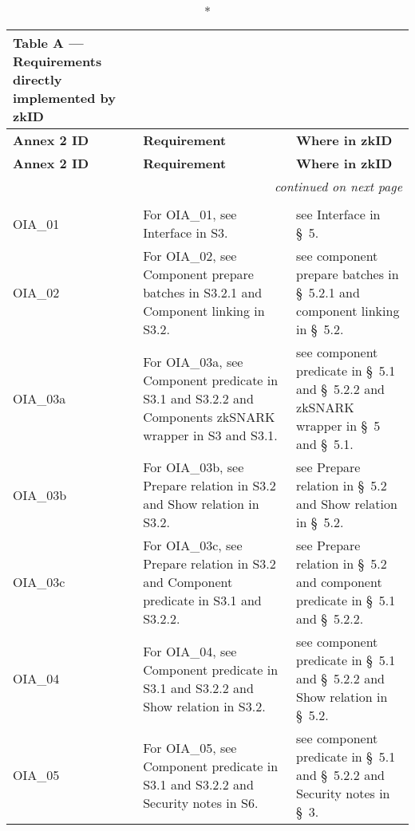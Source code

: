 \clearpage
\begin{landscape}
\small
\begin{longtable}{p{3cm} p{10cm} p{7cm}}
\caption*{Table A — Requirements directly implemented by zkID}\\
\toprule
\textbf{Annex 2 ID} &
\textbf{Requirement} &
\textbf{Where in zkID} \\
\midrule
\endfirsthead
\toprule
\textbf{Annex 2 ID} &
\textbf{Requirement} &
\textbf{Where in zkID} \\
\midrule
\endhead
\midrule
\multicolumn{3}{r}{\emph{continued on next page}}\\
\bottomrule
\endfoot
\bottomrule
\endlastfoot

\multicolumn{3}{l}{\textbf{Topic 1 — Online Identification and Authentication (OIA)}}\\

OIA\_01 &
For OIA\_01, see Interface in S3. &
see Interface in \S~5. \\

OIA\_02 &
For OIA\_02, see Component prepare batches in S3.2.1 and Component linking in S3.2. &
see component prepare batches in \S~5.2.1 and component linking in \S~5.2. \\

OIA\_03a &
For OIA\_03a, see Component predicate in S3.1 and S3.2.2 and Components zkSNARK wrapper in S3 and S3.1. &
see component predicate in \S~5.1 and \S~5.2.2 and zkSNARK wrapper in \S~5 and \S~5.1. \\

OIA\_03b &
For OIA\_03b, see Prepare relation in S3.2 and Show relation in S3.2. &
see Prepare relation in \S~5.2 and Show relation in \S~5.2. \\

OIA\_03c &
For OIA\_03c, see Prepare relation in S3.2 and Component predicate in S3.1 and S3.2.2. &
see Prepare relation in \S~5.2 and component predicate in \S~5.1 and \S~5.2.2. \\

OIA\_04 &
For OIA\_04, see Component predicate in S3.1 and S3.2.2 and Show relation in S3.2. &
see component predicate in \S~5.1 and \S~5.2.2 and Show relation in \S~5.2. \\

OIA\_05 &
For OIA\_05, see Component predicate in S3.1 and S3.2.2 and Security notes in S6. &
see component predicate in \S~5.1 and \S~5.2.2 and Security notes in \S~3. \\


\end{longtable}
\end{landscape}
